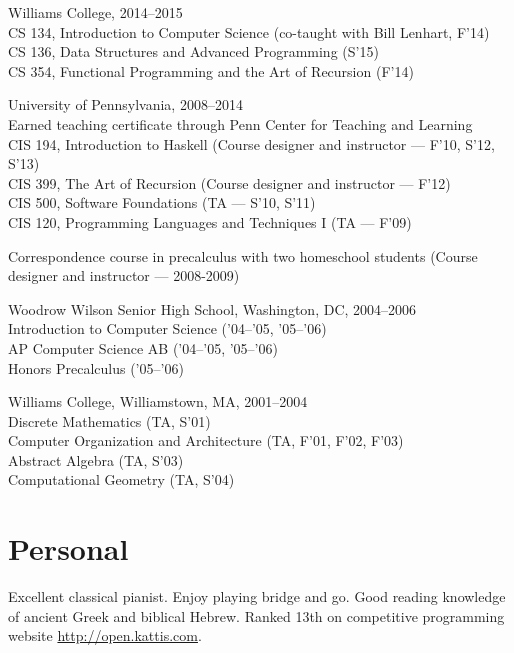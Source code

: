 \documentclass[12pt]{article}
\newcommand{\cvitem}{\par\hangpara{2em}{1}}
\begin{document}
\cvitem
Williams College, 2014--2015 \\
CS 134, Introduction to Computer Science (co-taught with Bill Lenhart,
F'14) \\
CS 136, Data Structures and Advanced Programming (S'15) \\
CS 354, Functional Programming and the Art of Recursion (F'14)

\cvitem
University of Pennsylvania, 2008--2014 \\
Earned teaching certificate through Penn Center for Teaching and
Learning \\
CIS 194, Introduction to Haskell (Course designer and instructor ---
F'10, S'12, S'13) \\
CIS 399, The Art of Recursion (Course designer and instructor ---
F'12) \\
CIS 500, Software Foundations (TA --- S'10, S'11) \\
CIS 120, Programming Languages and Techniques I (TA --- F'09)

\cvitem
Correspondence course in precalculus with two homeschool students
(Course designer and instructor --- 2008-2009)

\cvitem
Woodrow Wilson Senior High School, Washington, DC, 2004--2006 \\
Introduction to Computer Science ('04--'05, '05--'06) \\
AP Computer Science AB ('04--'05, '05--'06) \\
Honors Precalculus ('05--'06)

\cvitem
Williams College, Williamstown, MA, 2001--2004 \\
Discrete Mathematics (TA, S'01) \\
Computer Organization and Architecture (TA, F'01, F'02, F'03) \\
Abstract Algebra (TA, S'03) \\
Computational Geometry (TA, S'04) \\




\section*{Personal}

Excellent classical pianist.  Enjoy playing bridge and go.  Good
reading knowledge of ancient Greek and biblical Hebrew.  Ranked 13th
on competitive programming website \url{http://open.kattis.com}.
\end{document}

